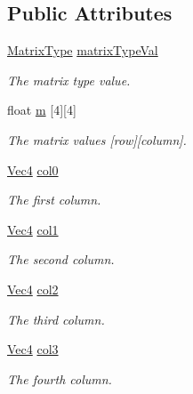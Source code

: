\subsection*{Public Attributes}
\begin{DoxyCompactItemize}
\item 
\hypertarget{structgfxmath_1_1_mat44_a523cda94e6f5b2df5276d821b3471605}{}\hyperlink{namespacegfxmath_a6c8951c82aec5015dd6806affb4c8d03}{Matrix\+Type} \hyperlink{structgfxmath_1_1_mat44_a523cda94e6f5b2df5276d821b3471605}{matrix\+Type\+Val}\label{structgfxmath_1_1_mat44_a523cda94e6f5b2df5276d821b3471605}

\begin{DoxyCompactList}\small\item\em The matrix type value. \end{DoxyCompactList}\item 
float \hyperlink{structgfxmath_1_1_mat44_a59a6195e1c74aee94b3434b9fed8aa7a}{m} \mbox{[}4\mbox{]}\mbox{[}4\mbox{]}
\begin{DoxyCompactList}\small\item\em The matrix values \mbox{[}row\mbox{]}\mbox{[}column\mbox{]}. \end{DoxyCompactList}\item 
\hyperlink{structgfxmath_1_1_vec4}{Vec4} \hyperlink{structgfxmath_1_1_mat44_a14a9f934c2487a5dd9e4702a0b539cb4}{col0}
\begin{DoxyCompactList}\small\item\em The first column. \end{DoxyCompactList}\item 
\hyperlink{structgfxmath_1_1_vec4}{Vec4} \hyperlink{structgfxmath_1_1_mat44_a9ac4cf40ac05a9ad94964d247d8256e1}{col1}
\begin{DoxyCompactList}\small\item\em The second column. \end{DoxyCompactList}\item 
\hyperlink{structgfxmath_1_1_vec4}{Vec4} \hyperlink{structgfxmath_1_1_mat44_aa810627c4b5df8432b36befdd4649763}{col2}
\begin{DoxyCompactList}\small\item\em The third column. \end{DoxyCompactList}\item 
\hyperlink{structgfxmath_1_1_vec4}{Vec4} \hyperlink{structgfxmath_1_1_mat44_a09c1b1363d41cee3b241cf8843d02289}{col3}
\begin{DoxyCompactList}\small\item\em The fourth column. \end{DoxyCompactList}\end{DoxyCompactItemize}
